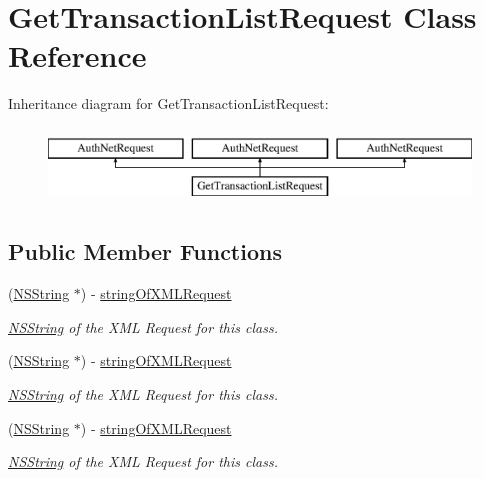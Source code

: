 \hypertarget{interface_get_transaction_list_request}{
\section{GetTransactionListRequest Class Reference}
\label{interface_get_transaction_list_request}
}
Inheritance diagram for GetTransactionListRequest:\begin{figure}[H]
\begin{center}
\leavevmode
\includegraphics[height=2.000000cm]{interface_get_transaction_list_request}
\end{center}
\end{figure}
\subsection*{Public Member Functions}
\begin{DoxyCompactItemize}
\item 
(\hyperlink{class_n_s_string}{NSString} $\ast$) -\/ \hyperlink{interface_get_transaction_list_request_ae48ed74252ae467a7505df4a14ce95db}{stringOfXMLRequest}
\begin{DoxyCompactList}\small\item\em \hyperlink{class_n_s_string}{NSString} of the XML Request for this class. \item\end{DoxyCompactList}\item 
(\hyperlink{class_n_s_string}{NSString} $\ast$) -\/ \hyperlink{interface_get_transaction_list_request_ae48ed74252ae467a7505df4a14ce95db}{stringOfXMLRequest}
\begin{DoxyCompactList}\small\item\em \hyperlink{class_n_s_string}{NSString} of the XML Request for this class. \item\end{DoxyCompactList}\item 
(\hyperlink{class_n_s_string}{NSString} $\ast$) -\/ \hyperlink{interface_get_transaction_list_request_ae48ed74252ae467a7505df4a14ce95db}{stringOfXMLRequest}
\begin{DoxyCompactList}\small\item\em \hyperlink{class_n_s_string}{NSString} of the XML Request for this class. \item\end{DoxyCompactList}\end{DoxyCompactItemize}
